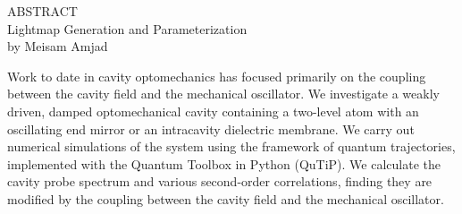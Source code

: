 \documentclass[12pt, oneside]{book}
\begin{document}
\thispagestyle{empty}
\singlespacing

\begin{center}
    ABSTRACT\\
    \vspace{2.0cm}
    Lightmap Generation and Parameterization\\
    \vspace{1.0cm}
    by Meisam Amjad\\
    \vspace{1.0cm}
\end{center}

\noindent Work to date in cavity optomechanics has focused primarily on the coupling between the cavity field and the mechanical oscillator. We investigate a weakly driven, damped optomechanical cavity containing a two-level atom with an oscillating end mirror or an intracavity dielectric membrane. We carry out numerical simulations of the system using the framework of quantum trajectories, implemented with the Quantum Toolbox in Python (QuTiP). We calculate the cavity probe spectrum and various second-order correlations, finding they are modified by the coupling between the cavity field and the mechanical oscillator.

\newpage

\thispagestyle{empty}

\frontmatter

\onehalfspacing
\end{document}
